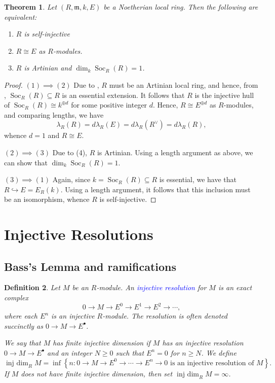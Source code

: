 \documentclass[10pt]{article}
\theoremstyle{thmstyle}
\newtheorem{theorem}{Theorem}[section]
\theoremstyle{defstyle}
\newtheorem{definition}[theorem]{Definition}
\newcommand{\frakm}{\mathfrak{m}} %
\newcommand{\into}{\hookrightarrow}
\newcommand{\define}[1]{\textcolor{blue}{\textit{#1}}}
\renewcommand{\ge}{\geqslant}
\newcommand{\Soc}{\operatorname{Soc}}
\newcommand{\injdim}{\operatorname{inj~dim}}
\begin{document}
\begin{theorem}
    Let $(R,\frakm, k, E)$ be a Noetherian local ring. Then the following are equivalent: 
    \begin{enumerate}[label=(\arabic*)]
        \item $R$ is self-injective
        \item $R\cong E$ as $R$-modules. 
        \item $R$ is Artinian and $\dim_k\Soc_R(R) = 1$.
    \end{enumerate}
\end{theorem}
\begin{proof}
$(1)\implies(2)$ Due to , $R$ must be an Artinian local ring, and hence, from , $\Soc_R(R)\subseteq R$ is an essential extension. It follows that $R$ is the injective hull of $\Soc_R(R)\cong k^{\oplus d}$ for some positive integer $d$. Hence, $R\cong E^{\oplus d}$ as $R$-modules, and comparing lengths, we have 
\begin{equation*}
    \lambda_R(R) = d\lambda_R(E) = d\lambda_R(R^\vee) = d\lambda_R(R),
\end{equation*}
whence $d = 1$ and $R\cong E$. 

$(2)\implies(3)$ Due to  (4), $R$ is Artinian. Using a length argument as above, we can show that $\dim_k\Soc_R(R) = 1$. 

$(3)\implies(1)$ Again, since $k = \Soc_R(R)\subseteq R$ is essential, we have that $R\into E = E_R(k)$. Using a length argument, it follows that this inclusion must be an isomorphism, whence $R$ is self-injective.
\end{proof}

\section{Injective Resolutions}

\subsection{Bass's Lemma and ramifications}

\begin{definition}
    Let $M$ be an $R$-module. An \define{injective resolution} for $M$ is an exact complex 
    \begin{equation*}
        0\to M\to E^0\to E^1\to E^2\to\cdots,
    \end{equation*}
    where each $E^n$ is an injective $R$-module. The resolution is often denoted succinctly as $0\to M\to E^\bullet$.

    We say that $M$ has finite injective dimension if $M$ has an injective resolution $0\to M\to E^\bullet$ and an integer $N\ge 0$ such that $E^n = 0$ for $n\ge N$. We define 
    \begin{equation*}
        \injdim_R M = \inf\left\{n\colon 0\to M\to E^0\to\cdots\to E^n\to 0\text{ is an injective resolution of } M\right\}.
    \end{equation*}
    If $M$ does not have finite injective dimension, then set $\injdim_R M = \infty$.
\end{definition}
\end{document}
